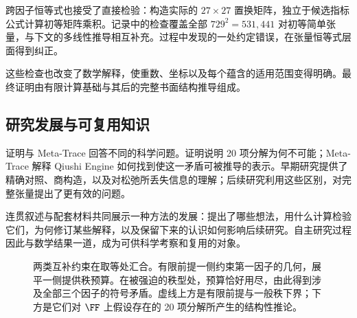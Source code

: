 跨因子恒等式也接受了直接检验：构造实际的 $27\times27$ 置换矩阵，独立于候选指标公式计算初等矩阵乘积。记录中的检查覆盖全部 $729^2=531{,}441$ 对初等简单张量，与下文的多线性推导相互补充。过程中发现的一处约定错误，在张量恒等式层面得到纠正。

这些检查也改变了数学解释，使重数、坐标以及每个蕴含的适用范围变得明确。最终证明由有限计算基础与其后的完整书面结构推导组成。

\subsection{研究发展与可复用知识}

证明与 Meta-Trace 回答不同的科学问题。证明说明 20 项分解为何不可能；Meta-Trace 解释 Qiushi Engine 如何找到使这一矛盾可被推导的表示。早期研究提供了精确对照、商构造，以及对松弛所丢失信息的理解；后续研究利用这些区别，对完整张量提出了更有效的问题。

连贯叙述与配套材料共同展示一种方法的发展：提出了哪些想法，用什么计算检验它们，为何修订某些解释，以及保留下来的认识如何影响后续研究。自主研究过程因此与数学结果一道，成为可供科学考察和复用的对象。

\begin{figure}[tbp]
  \centering
  \makebox[\linewidth][c]{\unskip}
  \caption{两类互补约束在取等处汇合。有限前提一侧约束第一因子的几何，展平一侧提供秩预算。在被强迫的秩型处，预算恰好用尽，由此得到涉及全部三个因子的符号矛盾。虚线上方是有限前提与一般秩下界；下方是它们对 $\FF$ 上假设存在的 20 项分解所产生的结构性推论。}
  \label{fig:proof-structure}
\end{figure}
\FloatBarrier
